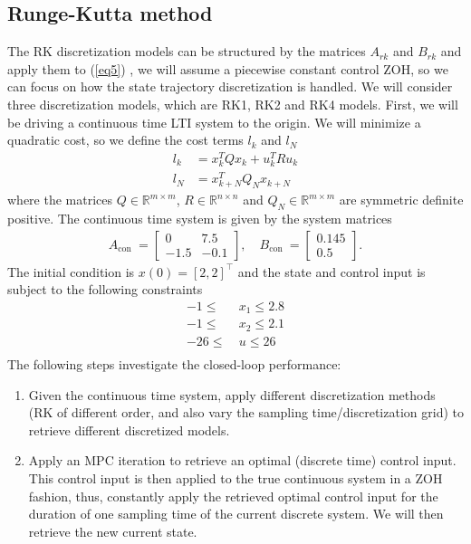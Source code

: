 \subsection{Runge-Kutta method}
The RK discretization models can be structured by the matrices $A_{rk}$ and $B_{rk}$ and apply them to (\ref{eq5}) , we will assume a piecewise constant control ZOH, so we can focus on how the state trajectory discretization is handled. We will consider three discretization models, which are RK1, RK2 and RK4 models.
First, we will be driving a continuous time LTI system to the origin. We will minimize a quadratic cost, so we define the cost terms $l_k$ and $l_N$
\begin{equation}
	\begin{split}
		l_k &= x_k^TQx_k + u_k^TRu_k\\
		l_N &= x_{k+N}^TQ_Nx_{k+N}
	\end{split}
\end{equation}
where the matrices $Q \in \mathbb{R}^{m \times m}$, $R \in \mathbb{R}^{n \times n}$ and $Q_N \in \mathbb{R}^{m \times m}$ are symmetric definite positive.
The continuous time system is given by the system matrices
\begin{equation}
	\begin{split}
		A_{\text {con }}=\left[\begin{array}{cc}
			0 & 7.5 \\
			-1.5 & -0.1
		\end{array}\right], \quad B_{\text {con }}=\left[\begin{array}{c}
			0.145 \\
			0.5
		\end{array}\right].
	\end{split}
\end{equation}
The initial condition is $x(0) = [2,2]^{\top}$ and the state and control input is subject to the following constraints
\begin{equation}
	\begin{split}
		 -1 \leq\  &x_1 \leq 2.8\\
		 -1 \leq\  &x_2 \leq 2.1\\
		 -26 \le\  &  u \le 26\\
	\end{split}
\end{equation}
The following steps investigate the closed-loop performance:
\begin{enumerate}
	\item Given the continuous time system, apply different discretization methods (RK of different order, and also vary the sampling time/discretization grid) to retrieve different discretized models.
	
	\item Apply an MPC iteration to retrieve an optimal (discrete time) control input. This control input is then applied to the true continuous system in a ZOH fashion, thus, constantly apply the retrieved optimal control input for the duration of one sampling time of the current discrete system. We will then retrieve the new current state.
\end{enumerate}
